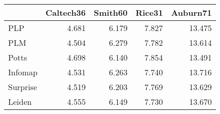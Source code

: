 \begin{tabular}{lrrrr}
\toprule
{} & Caltech36 & Smith60 & Rice31 & Auburn71 \\
\midrule
PLP      &     4.681 &   6.179 &  7.827 &   13.475 \\
PLM      &     4.504 &   6.279 &  7.782 &   13.614 \\
Potts    &     4.698 &   6.140 &  7.854 &   13.491 \\
Infomap  &     4.531 &   6.263 &  7.740 &   13.716 \\
Surprise &     4.519 &   6.203 &  7.769 &   13.629 \\
Leiden   &     4.555 &   6.149 &  7.730 &   13.670 \\
\bottomrule
\end{tabular}
